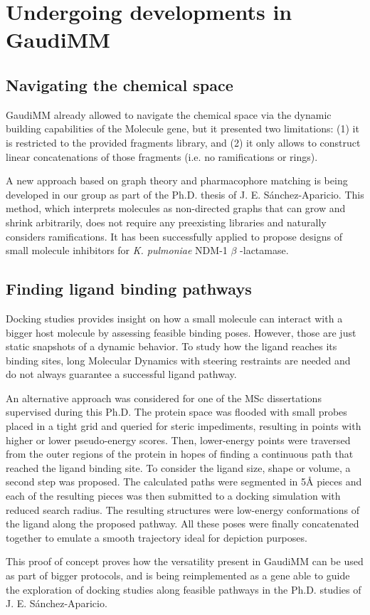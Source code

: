 \chapter{Undergoing developments in GaudiMM}
\label{chap:appendix-b}


\section{Navigating the chemical space}
GaudiMM already allowed to navigate the chemical space via the dynamic building capabilities of the Molecule gene, but it presented two limitations: (1) it is restricted to the provided fragments library, and (2) it only allows to construct linear concatenations of those fragments (i.e. no ramifications or rings).

A new approach based on graph theory and pharmacophore matching is being developed in our group as part of the Ph.D. thesis of J. E. Sánchez-Aparicio. This method, which interprets molecules as non-directed graphs that can grow and shrink arbitrarily, does not require any preexisting libraries and naturally considers ramifications. It has been successfully applied to propose designs of small molecule inhibitors for \textit{K. pulmoniae} NDM-1 $ \beta $ -lactamase.

\section{Finding ligand binding pathways}
Docking studies provides insight on how a small molecule can interact with a bigger host molecule by assessing feasible binding poses. However, those are just static snapshots of a dynamic behavior. To study how the ligand reaches its binding sites, long Molecular Dynamics with steering restraints are needed and do not always guarantee a successful ligand pathway.

An alternative approach was considered for one of the MSc dissertations supervised during this Ph.D. The protein space was flooded with small probes placed in a tight grid and queried for steric impediments, resulting in points with higher or lower pseudo-energy scores. Then, lower-energy points were traversed from the outer regions of the protein in hopes of finding a continuous path that reached the ligand binding site. To consider the ligand size, shape or volume, a second step was proposed. The calculated paths were segmented in 5Å pieces and each of the resulting pieces was then submitted to a docking simulation with reduced search radius. The resulting structures were low-energy conformations of the ligand along the proposed pathway. All these poses were finally concatenated together to emulate a smooth trajectory ideal for depiction purposes.

This proof of concept proves how the versatility present in GaudiMM can be used as part of bigger protocols, and is being reimplemented as a gene able to guide the exploration of docking studies along feasible pathways in the Ph.D. studies of J. E. Sánchez-Aparicio.
